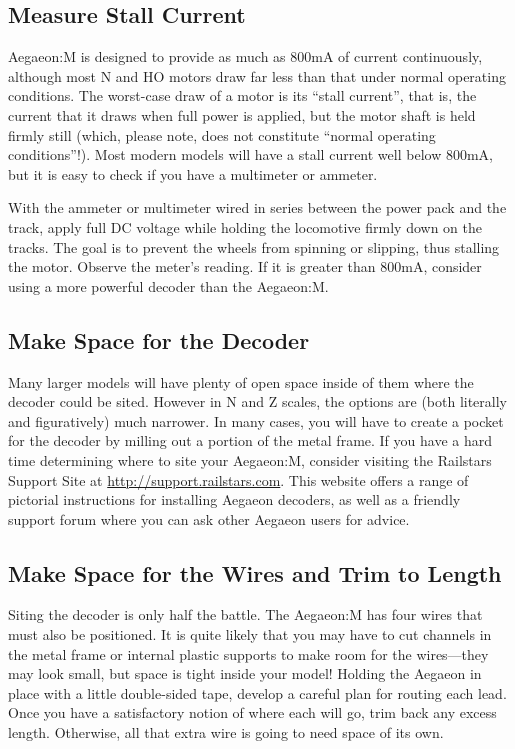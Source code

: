 \documentclass[12pt,letterpaper,draft]{memoir} %
\begin{document}
\subsection{Measure Stall Current}
Aegaeon:M is designed to provide as much as 800mA of current continuously, although most N and HO motors draw far less than that under normal operating conditions. The worst-case draw of a motor is its ``stall current'', that is, the current that it draws when full power is applied, but the motor shaft is held firmly still (which, please note, does not constitute ``normal operating conditions''!). Most modern models will have a stall current well below 800mA, but it is easy to check if you have a multimeter or ammeter.

With the ammeter or multimeter wired in series between the power pack and the track, apply full DC voltage while holding the locomotive firmly down on the tracks. The goal is to prevent the wheels from spinning or slipping, thus stalling the motor. Observe the meter's reading. If it is greater than 800mA, consider using a more powerful decoder than the Aegaeon:M.

\subsection{Make Space for the Decoder}
Many larger models will have plenty of open space inside of them where the decoder could be sited. However in N and Z scales, the options are (both literally and figuratively) much narrower. In many cases, you will have to create a pocket for the decoder by milling out a portion of the metal frame. If you have a hard time determining where to site your Aegaeon:M, consider visiting the Railstars Support Site at \url{http://support.railstars.com}. This website offers a range of pictorial instructions for installing Aegaeon decoders, as well as a friendly support forum where you can ask other Aegaeon users for advice.

\subsection{Make Space for the Wires and Trim to Length}
Siting the decoder is only half the battle. The Aegaeon:M has four wires that must also be positioned. It is quite likely that you may have to cut channels in the metal frame or internal plastic supports to make room for the wires---they may look small, but space is tight inside your model! Holding the Aegaeon in place with a little double-sided tape, develop a careful plan for routing each lead. Once you have a satisfactory notion of where each will go, trim back any excess length. Otherwise, all that extra wire is going to need space of its own.
\end{document}
